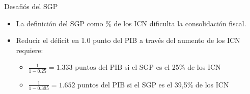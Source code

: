 \begin{frame}{Desafiós del SGP}
    \begin{itemize}
        \item La definición del SGP como \% de los ICN dificulta la consolidación fiscal.
        \item Reducir el déficit en 1.0 punto del PIB a través del aumento de los ICN requiere:
        \begin{itemize}
            \item $\frac{1}{1-0.25} = 1.333 \text{ puntos del PIB}$ si el SGP es el 25\% de los ICN
            \item $\frac{1}{1-0.395} = 1.652 \text{ puntos del PIB}$ si el SGP es el 39,5\% de los ICN
         
        \end{itemize}
    \end{itemize}
\end{frame}

